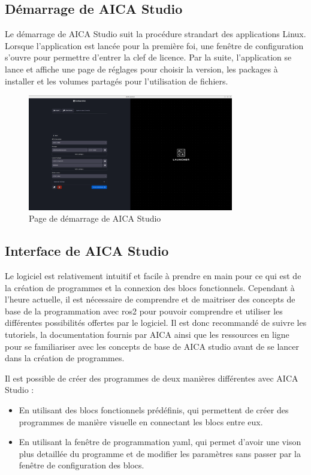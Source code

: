 \subsection{Démarrage de AICA Studio}
Le démarrage de AICA Studio suit la procédure strandart des applications Linux. Lorsque l'application est lancée pour la première foi, une fenêtre de configuration s'ouvre pour permettre d'entrer la clef de licence. Par la suite, l'application se lance et affiche une page de réglages pour choisir la version, les packages à installer et les volumes partagés pour l'utilisation de fichiers.

\begin{figure}[H]
    \centering
    \includegraphics[width=0.8\textwidth]{assets/figures/AICA_Mainmenu.png}
    \caption{Page de démarrage de AICA Studio}
    \label{fig:aica_startup}
\end{figure}

\subsection{Interface de AICA Studio}
Le logiciel est relativement intuitif et facile à prendre en main pour ce qui est de la création de programmes et la connexion des blocs fonctionnels. Cependant à l'heure actuelle, il est nécessaire de comprendre et de maitriser des concepts de base de la programmation avec \gls{ros2} pour pouvoir comprendre et utiliser les différentes possibilités offertes par le logiciel. Il est donc recommandé de suivre les tutoriels, la documentation fournis par AICA ainsi que les ressources en ligne pour se familiariser avec les concepts de base de AICA studio avant de se lancer dans la création de programmes.

Il est possible de créer des programmes de deux manières différentes avec AICA Studio :
\begin{itemize}
    \item En utilisant des blocs fonctionnels prédéfinis, qui permettent de créer des programmes de manière visuelle en connectant les blocs entre eux.
    \item En utilisant la fenêtre de programmation \gls{yaml}, qui permet d'avoir une vison plus detaillée du programme et de modifier les paramètres sans passer par la fenêtre de configuration des blocs.
\end{itemize}

